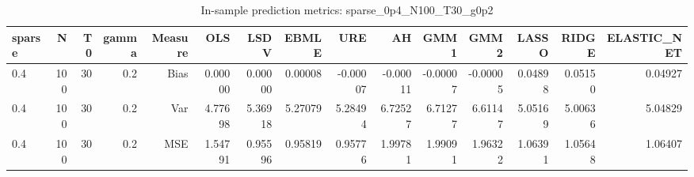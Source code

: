 \begin{table}[!htbp]\centering
\caption{In-sample prediction metrics: sparse_0p4_N100_T30_g0p2}
\label{tab:table2_sparse_0p4_N100_T30_g0p2}
\begin{tabular}{lrrrrrrrrrrrrrr}
\hline
sparse & N & T0 & gamma & Measure & OLS & LSDV & EBMLE & URE & AH & GMM1 & GMM2 & LASSO & RIDGE & ELASTIC_NET \\
\hline
0.4 & 100 & 30 & 0.2 & Bias & 0.00000 & 0.00000 & 0.00008 & -0.00007 & -0.00011 & -0.00007 & -0.00005 & 0.04898 & 0.05150 & 0.04927 \\
0.4 & 100 & 30 & 0.2 & Var & 4.77698 & 5.36918 & 5.27079 & 5.28494 & 6.72527 & 6.71277 & 6.61147 & 5.05169 & 5.00636 & 5.04829 \\
0.4 & 100 & 30 & 0.2 & MSE & 1.54791 & 0.95596 & 0.95819 & 0.95776 & 1.99781 & 1.99091 & 1.96322 & 1.06391 & 1.05648 & 1.06407 \\
\hline
\end{tabular}
\end{table}

